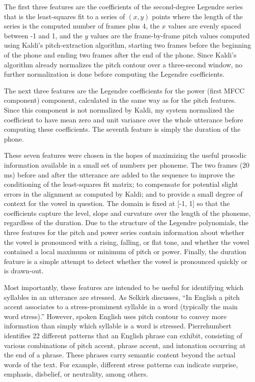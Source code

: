 \documentclass{article}
\begin{document}
The first three features are the coefficients of the second-degree Legendre series that is the least-squares fit to a series of $(x, y)$ points where the length of the series is the computed number of frames plus 4, the $x$ values are evenly spaced between -1 and 1, and the $y$ values are the frame-by-frame pitch values computed using Kaldi's pitch-extraction algorithm, starting two frames before the beginning of the phone and ending two frames after the end of the phone.
Since Kaldi's algorithm already normalizes the pitch contour over a three-second window, no further normalization is done before computing the Legendre coefficients.

The next three features are the Legendre coefficients for the power (first MFCC component) component, calculated in the same way as for the pitch features. Since this component is not normalized by Kaldi, my system normalized the coefficient to have mean zero and unit variance over the whole utterance before computing these coefficients.
The seventh feature is simply the duration of the phone.

These seven features were chosen in the hopes of maximizing the useful prosodic information available in a small set of numbers per phoneme.
The two frames (20 ms) before and after the utterance are added to the sequence to improve the conditioning of the least-squares fit matrix; to compensate for potential slight errors in the alignment as computed by Kaldi; and to provide a small degree of context for the vowel in question.
The domain is fixed at [-1, 1] so that the coefficients capture the level, slope and curvature over the length of the phoneme, regardless of the duration.
Due to the structure of the Legendre polynomials, the three features for the pitch and power series contain information about whether the vowel is pronounced with a rising, falling, or flat tone, and whether the vowel contained a local maximum or minimum of pitch or power.
Finally, the duration feature is a simple attempt to detect whether the vowel is pronounced quickly or is drawn-out.

Most importantly, these features are intended to be useful for identifying which syllables in an utterance are stressed. As Selkirk \cite{selkirk1995sentence} discusses, ``In English a pitch accent associates to a stress-promiment syllable in a word (typically the main word stress).''
However, spoken English uses pitch contour to convey more information than simply which syllable is a word is stressed. Pierrehumbert \cite{pierrehumbert1980phonology} identifies 22 different patterns that an English phrase can exhibit, consisting of various combinations of pitch accent, phrase accent, and intonation occurring at the end of a phrase.
These phrases carry semantic content beyond the actual words of the text. For example, different stress patterns can indicate surprise, emphasis, disbelief, or neutrality, among others.
\end{document}
